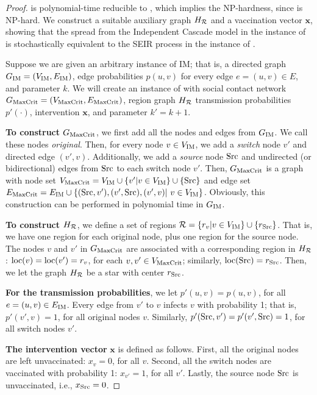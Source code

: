 \begin{proof}
\infmax{} is polynomial-time reducible to \maxcrit{}, which implies the NP-hardness, since \infmax{} is NP-hard. We construct a suitable auxiliary graph $H_{\mathcal{R}}$ and a vaccination vector $\mathbf{x}$, showing that the spread from the Independent Cascade model in the instance of \infmax{} is stochastically equivalent to the SEIR process in the instance of \maxcrit{}.

Suppose we are given an arbitrary instance of IM; that is, a directed graph $G_{\textsc{IM}}=(V_{\textsc{IM}},E_{\textsc{IM}})$, edge probabilities $p(u,v)$ for every edge $e=(u,v) \in E$, and parameter $k$. We will create an instance of \maxcrit{} with social contact network $G_{\text{MaxCrit}} = (V_{\text{MaxCrit}}, E_{\text{MaxCrit}})$, region graph $H_{\mathcal{R}}$ transmission probabilities $p'(\cdot)$, intervention $\mathbf{x}$, and parameter $k'=k+1$.

\noindent
\textbf{To construct $G_{\text{MaxCrit}}{}$}, we first add all the nodes and edges from $G_{\textsc{IM}}$. We call these nodes \emph{original}. Then, for every node $v \in V_{\textsc{IM}}{}$, we add a \emph{switch} node $v'$ and directed edge $(v', v)$. Additionally, we add a \emph{source} node $\text{Src}$ and undirected (or bidirectional) edges from $\text{Src}$ to each switch node $v'$.
Then, $G_{\text{MaxCrit}}{}$ is a graph with node set $V_{\text{MaxCrit}}{} = V_{\textsc{IM}}{} \cup \{v'| v \in V_{\textsc{IM}}{}\} \cup \{\text{Src}\}$ and edge set $E_{\text{MaxCrit}}{} = E_{\textsc{IM}}{} \cup \{(\text{Src},v'), (v', \text{Src}), (v', v)|\ v \in V_{\textsc{IM}}{}\}$. Obviously, this construction can be performed in polynomial time in $G_{\textsc{IM}}{}$.

\noindent
\textbf{To construct $H_{\mathcal{R}}$}, we define a set of regions $\mathcal{R} = \{r_v | v \in V_{\textsc{IM}}{}\} \cup \{r_{\text{Src}}\}$. That is, we have one region for each original node, plus one region for the source node. The nodes $v$ and $v'$ in $G_{\text{MaxCrit}}{}$ are associated with a corresponding region in $H_{\mathcal{R}}$: $\text{loc}(v)=\text{loc}(v') = r_v$, for each $v,v'\in V_{\text{MaxCrit}}{}$; similarly, $\text{loc}(\text{Src}) = r_{\text{Src}}$. Then, we let the graph $H_{\mathcal{R}}$ be a star with center $r_{\text{Src}}$.

\noindent
\textbf{For the transmission probabilities}, we let $p'(u, v) = p(u,v)$, for all $e=(u,v) \in E_{\textsc{IM}}{}$.
Every edge from $v'$ to $v$ infects $v$ with probability 1; that is, $p'(v',v) = 1$, for all original nodes $v$. Similarly, $p'(\text{Src}, v') = p'(v', \text{Src}) = 1$, for all switch nodes $v'$.

\noindent
\textbf{The intervention vector} $\mathbf{x}$ is defined as follows. 
First, all the original nodes are left unvaccinated: $x_v = 0$, for all $v$. Second, all the switch nodes are vaccinated with probability 1: $x_{v'} = 1$, for all $v'$. Lastly, the source node $\text{Src}$ is unvaccinated, i.e., $x_{\text{Src}}=0$. 


\end{proof}
